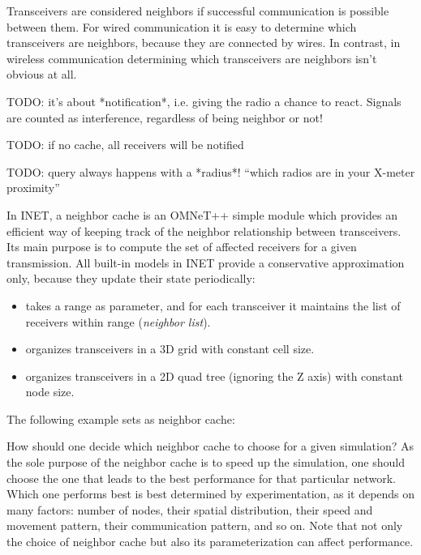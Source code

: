 Transceivers are considered neighbors if successful communication is
possible between them. For wired communication it is easy to determine
which transceivers are neighbors, because they are connected by wires. In
contrast, in wireless communication determining which transceivers are
neighbors isn't obvious at all.

TODO: it's about *notification*, i.e. giving the radio a chance
to react. Signals are counted as interference, regardless of being neighbor or not!

TODO: if no cache, all receivers will be notified

TODO: query always happens with a *radius*!  ``which radios are in your  X-meter proximity''

In INET, a neighbor cache is an OMNeT++ simple module which provides
an efficient way of keeping track of the neighbor relationship between
transceivers. Its main purpose is to compute the set of affected receivers
for a given transmission. All built-in models in INET provide a
conservative approximation only, because they update their state
periodically:

\begin{itemize}
  \item {} takes a range as parameter,
    and for each transceiver it maintains the list of receivers within
    range (\textit{neighbor list}).
  \item {} organizes transceivers in a 3D grid with
    constant cell size.
  \item {} organizes transceivers in a 2D quad tree
    (ignoring the Z axis) with constant node size.
\end{itemize}

The following example sets  as neighbor cache:


How should one decide which neighbor cache to choose for a given simulation?
As the sole purpose of the neighbor cache is to speed up the simulation,
one should choose the one that leads to the best performance for that particular
network. Which one performs best is best determined by experimentation, as it
depends on many factors: number of nodes, their spatial distribution, their
speed and movement pattern, their communication pattern, and so on.
Note that not only the choice of neighbor cache but also its parameterization
can affect performance.


